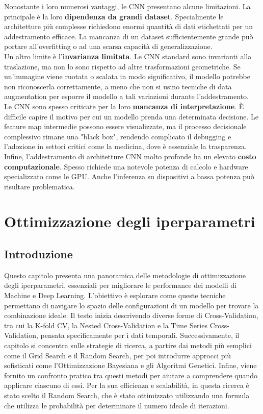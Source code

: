 \documentclass[a4paper,12pt]{report}
\begin{document}
	Nonostante i loro numerosi vantaggi, le CNN presentano alcune limitazioni. La principale è la loro \textbf{dipendenza da grandi dataset}. Specialmente le architetture più complesse richiedono enormi quantità di dati etichettati per un addestramento efficace. La mancanza di un dataset sufficientemente grande può portare all'overfitting o ad una scarsa capacità di generalizzazione. \\
	Un altro limite è l'\textbf{invarianza limitata}. Le CNN standard sono invarianti alla traslazione, ma non lo sono rispetto ad altre trasformazioni geometriche. Se un'immagine viene ruotata o scalata in modo significativo, il modello potrebbe non riconoscerla correttamente, a meno che non si usino tecniche di data augmentation per esporre il modello a tali variazioni durante l'addestramento. \\
	Le CNN sono spesso criticate per la loro \textbf{mancanza di interpretazione}. È difficile capire il motivo per cui un modello prenda una determinata decisione. Le feature map intermedie possono essere visualizzate, ma il processo decisionale complessivo rimane una "black box", rendendo complicato il debugging e l'adozione in settori critici come la medicina, dove è essenziale la trasparenza. \\
	Infine, l'addestramento di architetture CNN molto profonde ha un elevato \textbf{costo computazionale}. Spesso richiede una notevole potenza di calcolo e hardware specializzato come le GPU. Anche l'inferenza su dispositivi a bassa potenza può risultare problematica.
	
	\chapter{Ottimizzazione degli iperparametri}
	
	\section{Introduzione}
	Questo capitolo presenta una panoramica delle metodologie di ottimizzazione degli iperparametri, essenziali per migliorare le performance dei modelli di Machine e Deep Learning. L'obiettivo è esplorare come queste tecniche permettano di navigare lo spazio delle configurazioni di un modello per trovare la combinazione ideale. Il testo inizia descrivendo diverse forme di Cross-Validation, tra cui la K-fold CV, la Nested Cross-Validation e la Time Series Cross-Validation, pensata specificamente per i dati temporali. Successivamente, il capitolo si concentra sulle strategie di ricerca, a partire dai metodi più semplici come il Grid Search e il Random Search, per poi introdurre approcci più sofisticati come l'Ottimizzazione Bayesiana e gli Algoritmi Genetici. Infine, viene fornito un confronto pratico tra questi metodi per aiutare a comprendere quando applicare ciascuno di essi. Per la sua efficienza e scalabilità, in questa ricerca è stato scelto il Random Search, che è stato ottimizzato utilizzando una formula che utilizza le probabilità per determinare il numero ideale di iterazioni. \cite{franceschi2024hyperparameter, wainer2018cvncv, deng2023tscv, bergstra2012random, snoek2012bo, alibrahim2021gagsbo}
	
\end{document}
